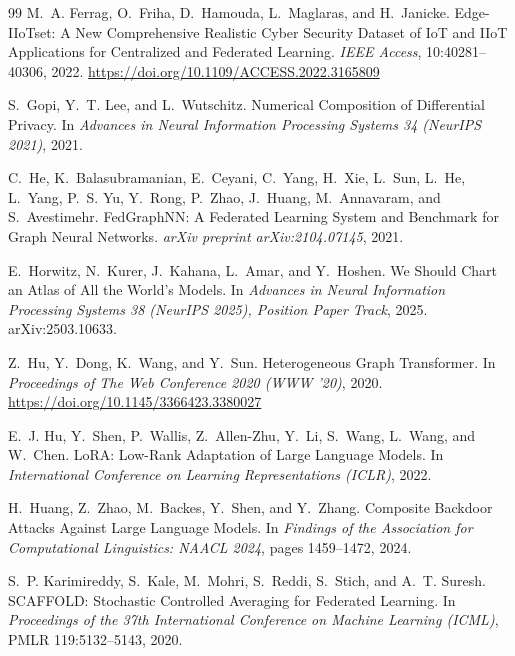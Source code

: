 \begin{thebibliography}{99}
M.~A. Ferrag, O.~Friha, D.~Hamouda, L.~Maglaras, and H.~Janicke.
\newblock Edge-IIoTset: A New Comprehensive Realistic Cyber Security Dataset of IoT and IIoT Applications for Centralized and Federated Learning.
\newblock \emph{IEEE Access}, 10:40281--40306, 2022.
\newblock \url{https://doi.org/10.1109/ACCESS.2022.3165809}

S.~Gopi, Y.~T. Lee, and L.~Wutschitz.
\newblock Numerical Composition of Differential Privacy.
\newblock In \emph{Advances in Neural Information Processing Systems 34 (NeurIPS 2021)}, 2021.

C.~He, K.~Balasubramanian, E.~Ceyani, C.~Yang, H.~Xie, L.~Sun, L.~He, L.~Yang, P.~S. Yu, Y.~Rong, P.~Zhao, J.~Huang, M.~Annavaram, and S.~Avestimehr.
\newblock FedGraphNN: A Federated Learning System and Benchmark for Graph Neural Networks.
\newblock \emph{arXiv preprint arXiv:2104.07145}, 2021.

E.~Horwitz, N.~Kurer, J.~Kahana, L.~Amar, and Y.~Hoshen.
\newblock We Should Chart an Atlas of All the World's Models.
\newblock In \emph{Advances in Neural Information Processing Systems 38 (NeurIPS 2025), Position Paper Track}, 2025.
\newblock arXiv:2503.10633.

Z.~Hu, Y.~Dong, K.~Wang, and Y.~Sun.
\newblock Heterogeneous Graph Transformer.
\newblock In \emph{Proceedings of The Web Conference 2020 (WWW '20)}, 2020.
\newblock \url{https://doi.org/10.1145/3366423.3380027}

E.~J. Hu, Y.~Shen, P.~Wallis, Z.~Allen-Zhu, Y.~Li, S.~Wang, L.~Wang, and W.~Chen.
\newblock LoRA: Low-Rank Adaptation of Large Language Models.
\newblock In \emph{International Conference on Learning Representations (ICLR)}, 2022.

H.~Huang, Z.~Zhao, M.~Backes, Y.~Shen, and Y.~Zhang.
\newblock Composite Backdoor Attacks Against Large Language Models.
\newblock In \emph{Findings of the Association for Computational Linguistics: NAACL 2024}, pages 1459--1472, 2024.

S.~P. Karimireddy, S.~Kale, M.~Mohri, S.~Reddi, S.~Stich, and A.~T. Suresh.
\newblock SCAFFOLD: Stochastic Controlled Averaging for Federated Learning.
\newblock In \emph{Proceedings of the 37th International Conference on Machine Learning (ICML)}, PMLR 119:5132--5143, 2020.


\end{thebibliography}
